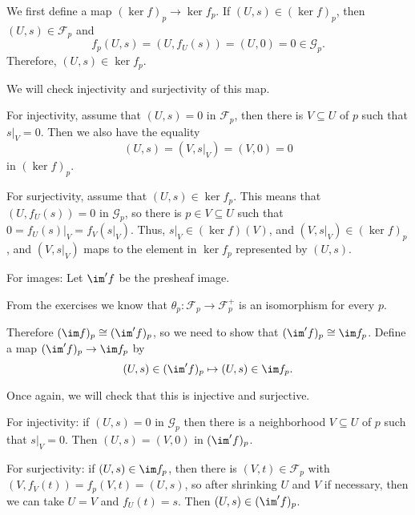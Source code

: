 We first define a map $(\ker f)_p \to \ker f_p$. If $(U, s) \in (\ker f)_p$, then
$(U, s) \in \mathcal{F}_p$ and
\[ f_p(U, s) = (U, f_U(s)) = (U, 0) = 0 \in \mathcal{G}_p. \]
Therefore, $(U, s) \in \ker f_p$.

We will check injectivity and surjectivity of this map.

For injectivity, assume that $(U, s) = 0$ in $\mathcal{F}_p$, then there is
$V \subseteq U$ of $p$ such that $s|_V = 0$. Then we also have the equality
\[ (U, s) = (V, s|_V) = (V, 0) = 0 \]
in  $(\ker f)_p$.

For surjectivity, assume that $(U, s) \in \ker f_p$. This means that
 $(U, f_U(s)) = 0$ in $\mathcal{G}_p$, so there is $p \in V \subseteq U$ such
 that $0 = f_U(s)|_V = f_V(s|_V)$. Thus, $s|_V \in (\ker f)(V)$, and
 $(V, s|_V) \in (\ker f)_p$, and $(V, s|_V)$ maps to the element in $\ker f_p$
 represented by $(U, s)$.

For images: Let $\im' f$ be the presheaf image.

From the exercises we know that $\theta_p\colon \mathcal{F}_p \to \mathcal{F}^+_p$ is
an isomorphism for every $p$.

Therefore $(\im f)_p \cong (\im' f)_p$, so we need to show that
$(\im' f)_p \cong \im f_p$. Define a map
$(\im' f)_p \to \im f_p$ by
\[ (U, s)  \in (\im' f)_p \mapsto (U, s) \in \im f_p. \]

Once again, we will check that this is injective and surjective.

For injectivity: if $(U, s) = 0$ in $\mathcal{G}_p$ then there is a neighborhood
$V \subseteq U$ of $p$ such that $s|_V = 0$. Then $(U, s) = (V, 0)$ in $(\im' f)_p$.

For surjectivity: if $(U, s) \in \im f_p$, then there is
$(V, t) \in \mathcal{F}_p$ with $(V, f_V(t)) = f_p(V, t) = (U, s)$, so after
shrinking $U$ and $V$ if necessary, then we can take $U = V$ and
$f_U(t) = s$. Then $(U, s) \in (\im' f)_p$.
